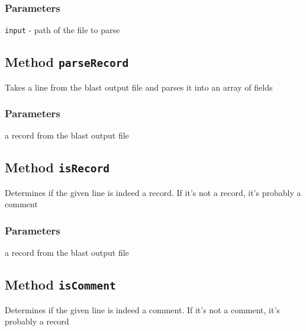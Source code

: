 \subsubsection*{Parameters\label{Parameters}}
\begin{description}

\item[{\texttt{input} - path of the file to parse}] \mbox{}\end{description}
\subsection*{Method \texttt{parseRecord}\label{Method_parseRecord}}


Takes a line from the blast output file and parses it into an array of fields

\subsubsection*{Parameters\label{Parameters}}
\begin{description}

\item[{a record from the blast output file}] \mbox{}\end{description}
\subsection*{Method \texttt{isRecord}\label{Method_isRecord}}


Determines if the given line is indeed a record. If it's not a record, it's probably
a comment

\subsubsection*{Parameters\label{Parameters}}
\begin{description}

\item[{a record from the blast output file}] \mbox{}\end{description}
\subsection*{Method \texttt{isComment}\label{Method_isComment}}


Determines if the given line is indeed a comment. If it's not a comment, it's probably
a record

